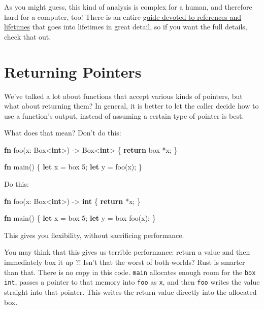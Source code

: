 \documentclass[]{article}
\newenvironment{Shaded}{}{}
\newcommand{\KeywordTok}[1]{\textcolor[rgb]{0.00,0.44,0.13}{\textbf{{#1}}}}
\newcommand{\DecValTok}[1]{\textcolor[rgb]{0.25,0.63,0.44}{{#1}}}
\newcommand{\NormalTok}[1]{{#1}}
\begin{document}
As you might guess, this kind of analysis is complex for a human, and
therefore hard for a computer, too! There is an entire
\href{guide-lifetimes.html}{guide devoted to references and lifetimes}
that goes into lifetimes in great detail, so if you want the full
details, check that out.

\section{Returning Pointers}\label{returning-pointers}

We've talked a lot about functions that accept various kinds of
pointers, but what about returning them? In general, it is better to let
the caller decide how to use a function's output, instead of assuming a
certain type of pointer is best.

What does that mean? Don't do this:

\begin{Shaded}
\begin{Highlighting}[]
\KeywordTok{fn} \NormalTok{foo(x: Box<}\KeywordTok{int}\NormalTok{>) -> Box<}\KeywordTok{int}\NormalTok{> \{}
    \KeywordTok{return} \NormalTok{box *x;}
\NormalTok{\}}

\KeywordTok{fn} \NormalTok{main() \{}
    \KeywordTok{let} \NormalTok{x = box }\DecValTok{5}\NormalTok{;}
    \KeywordTok{let} \NormalTok{y = foo(x);}
\NormalTok{\}}
\end{Highlighting}
\end{Shaded}

Do this:

\begin{Shaded}
\begin{Highlighting}[]
\KeywordTok{fn} \NormalTok{foo(x: Box<}\KeywordTok{int}\NormalTok{>) -> }\KeywordTok{int} \NormalTok{\{}
    \KeywordTok{return} \NormalTok{*x;}
\NormalTok{\}}

\KeywordTok{fn} \NormalTok{main() \{}
    \KeywordTok{let} \NormalTok{x = box }\DecValTok{5}\NormalTok{;}
    \KeywordTok{let} \NormalTok{y = box foo(x);}
\NormalTok{\}}
\end{Highlighting}
\end{Shaded}

This gives you flexibility, without sacrificing performance.

You may think that this gives us terrible performance: return a value
and then immediately box it up ?! Isn't that the worst of both worlds?
Rust is smarter than that. There is no copy in this code. \texttt{main}
allocates enough room for the \texttt{box int}, passes a pointer to that
memory into \texttt{foo} as \texttt{x}, and then \texttt{foo} writes the
value straight into that pointer. This writes the return value directly
into the allocated box.
\end{document}
